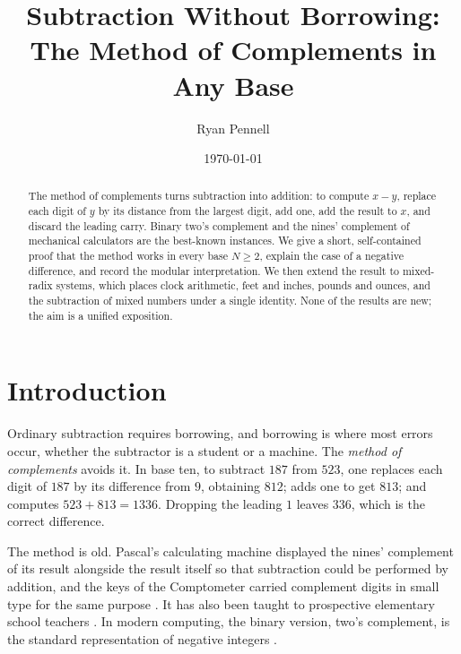\documentclass[11pt]{amsart}
\theoremstyle{definition}
\theoremstyle{remark}
\begin{document}
\title{Subtraction Without Borrowing:\texorpdfstring{\\}{ } The Method of Complements in Any Base}

\author{Ryan Pennell}
\address{Ivy Tech Community College, Bloomington, Indiana}


\date{\today}

\begin{abstract}
The method of complements turns subtraction into addition: to compute $x - y$,
replace each digit of $y$ by its distance from the largest digit, add one, add
the result to $x$, and discard the leading carry. Binary two's complement and the
nines' complement of mechanical calculators are the best-known instances. We give
a short, self-contained proof that the method works in every base $N \ge 2$,
explain the case of a negative difference, and record the modular interpretation.
We then extend the result to mixed-radix systems, which places clock arithmetic,
feet and inches, pounds and ounces, and the subtraction of mixed numbers under
a single identity. None of the results are new; the aim is a unified exposition.
\end{abstract}

\maketitle

\section{Introduction}

Ordinary subtraction requires borrowing, and borrowing is where most errors
occur, whether the subtractor is a student or a machine. The \emph{method of
complements} avoids it. In base ten, to subtract $187$ from $523$, one replaces
each digit of $187$ by its difference from $9$, obtaining $812$; adds one to get
$813$; and computes $523 + 813 = 1336$. Dropping the leading $1$ leaves $336$,
which is the correct difference.

The method is old. Pascal's calculating machine displayed the nines' complement
of its result alongside the result itself so that subtraction could be performed
by addition, and the keys of the Comptometer carried complement digits in small
type for the same purpose \cite{comptometer,wiki}. It has also been taught to
prospective elementary school teachers \cite{allendoerfer}. In modern computing,
the binary version, two's complement, is the standard representation of negative
integers \cite{knuth}.
\end{document}
